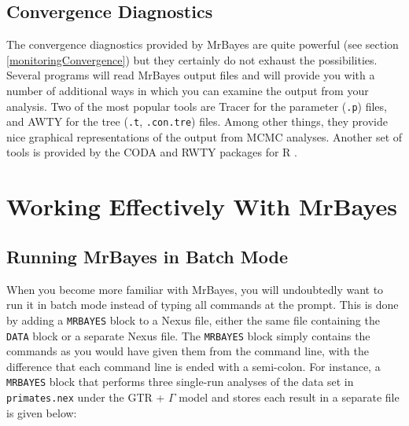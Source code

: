 \documentclass[12pt]{book}
\begin{document}
\subsection{Convergence Diagnostics}

The convergence diagnostics provided by MrBayes are quite powerful (see section
\ref{monitoringConvergence}) but they certainly do not exhaust the possibilities. Several programs
will read MrBayes output files and will provide you with a number of additional ways in which you
can examine the output from your analysis. Two of the most popular tools are Tracer
\citep{rambaut18} for the parameter (\texttt{.p}) files, and AWTY \citep{nylander07} for the tree
(\texttt{.t}, \texttt{.con.tre}) files. Among other things, they provide nice graphical
representations of the output from MCMC analyses. Another set of tools is provided by the CODA
\citep{plummer06} and RWTY \citep{warren17} packages for R \citep{rcoreteam18}.


\section{Working Effectively With MrBayes}

\subsection{Running MrBayes in Batch Mode}

When you become more familiar with MrBayes, you will undoubtedly want to run it in batch mode
instead of typing all commands at the prompt. This is done by adding a \texttt{MRBAYES} block to a
Nexus file, either the same file containing the \texttt{DATA} block or a separate Nexus file. The
\texttt{MRBAYES} block simply contains the commands as you would have given them from the command
line, with the difference that each command line is ended with a semi-colon. For instance, a
\texttt{MRBAYES} block that performs three single-run analyses of the data set in
\texttt{primates.nex} under the GTR + $\Gamma$ model and stores each result in a separate file is
given below:
\end{document}
